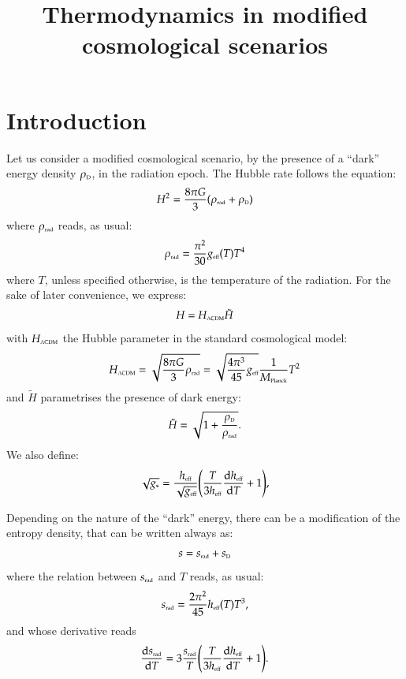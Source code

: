 


\title{Thermodynamics in modified cosmological scenarios}

\maketitle
\section{Introduction}
Let us consider a modified cosmological scenario, by the presence of a ``dark'' energy
density $\rhoD$, in the radiation epoch. The Hubble rate follows the equation:
\begin{align}
 H^2 = \frac{8 \pi G}{3}(\rhorad + \rhoD)
\end{align}
where $\rhorad$ reads, as usual:
\begin{align}
 \rhorad = \frac{\pi^2}{30}\geff(T) T^4
\end{align}
where $T$, unless specified otherwise, is the temperature of the radiation.
For the sake of later convenience, we express:
\begin{align}
 H = H\ped{$\Lambda$CDM}\tilde H
\end{align}
with $H\ped{$\Lambda$CDM}$ the Hubble parameter in the standard cosmological model:
\begin{align}
 H\ped{$\Lambda$CDM} = \sqrt{\frac{8 \pi G}{3}\rhorad} = \sqrt{\frac{4\pi^3}{45}\geff}\frac{1}{\Mpl}T^2
\end{align}
and $\tilde H$ parametrises the presence of dark energy:
\begin{align}
 \tilde H = \sqrt{1+ \frac{\rhoD}{\rhorad}}.
\end{align}
We also define:
\begin{align}
 \sqrt{g_{\ast}} = \frac{\heff}{\sqrt{\geff}} \qty(\frac{T}{3\heff}\dv{\heff}{T} +1),
\end{align}

Depending on the nature of the ``dark'' energy, there can be a modification of the entropy density, that can be written always as:
\begin{align}\label{eqn:totals}
 s = \srad + \sD
\end{align}
where the relation between $\srad$ and $T$ reads, as usual:
\begin{align}\label{expr:sradlcdm}
 \srad = \frac{2\pi^2}{45}\heff(T) T^3,
\end{align}
and whose derivative reads
\begin{align}\label{expr:dsraddT}
 \dv{\srad}{T} = 3 \frac{\srad}{T} \qty( \frac{T}{3\heff}\dv{\heff}{T} +1).
\end{align}


